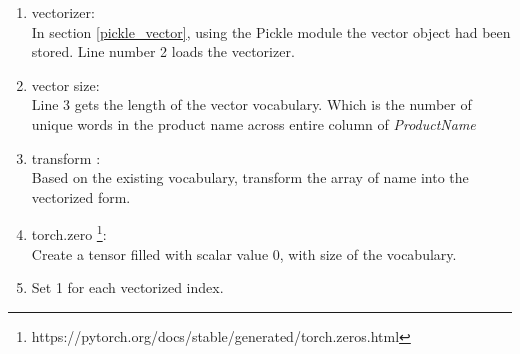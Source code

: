\begin{enumerate}
    \item vectorizer: \\
    In section \ref{pickle_vector}, using the Pickle module the vector object had been stored. Line number 2 loads the vectorizer.
    \item vector size: \\
    Line 3 gets the length of the vector vocabulary. Which is the number of unique words in the product name across entire column of \textit{ProductName}
    \item transform : \\
    Based on the existing vocabulary, transform the array of name into the vectorized form.
    \item torch.zero \footnote{https://pytorch.org/docs/stable/generated/torch.zeros.html}: \\
    Create a tensor filled with scalar value 0, with size of the vocabulary.
    \item Set 1 for each vectorized index.
    
\end{enumerate}




